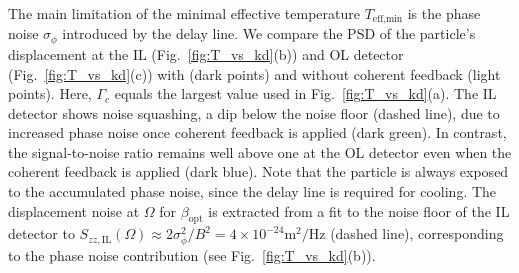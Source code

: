 \documentclass[reprint,aps,prl,superscriptaddress]{revtex4-2}
\begin{document}
The main limitation of the minimal effective temperature $T_\text{eff,min}$ is the phase noise $\sigma_\phi$ introduced by the delay line. 
We compare the PSD of the particle's displacement at the IL (Fig.~\ref{fig:T_vs_kd}(b)) and OL detector (Fig.~\ref{fig:T_vs_kd}(c)) with (dark points)  and without coherent feedback (light points). Here, $\Gamma_c$ equals the largest value used in Fig.~\ref{fig:T_vs_kd}(a). The IL detector shows noise squashing, a dip below the noise floor (dashed line), due to increased phase noise once coherent feedback is applied (dark green). %
In contrast, the signal-to-noise ratio remains well above one at the OL detector even when the coherent feedback is applied (dark blue). Note that the particle is always exposed to the accumulated phase noise, since the delay line is required for cooling. %
The displacement noise at $\Omega$ for $\beta_\text{opt}$ is extracted from a fit to the noise floor of the IL detector to $S_{zz,\text{IL}}(\Omega) \approx 2\sigma_{\phi}^2/B^2= 4\times10^{-24}\text{m}^2/\text{Hz}$ (dashed line), corresponding to the phase noise contribution (see Fig.~\ref{fig:T_vs_kd}(b)).
\end{document}
